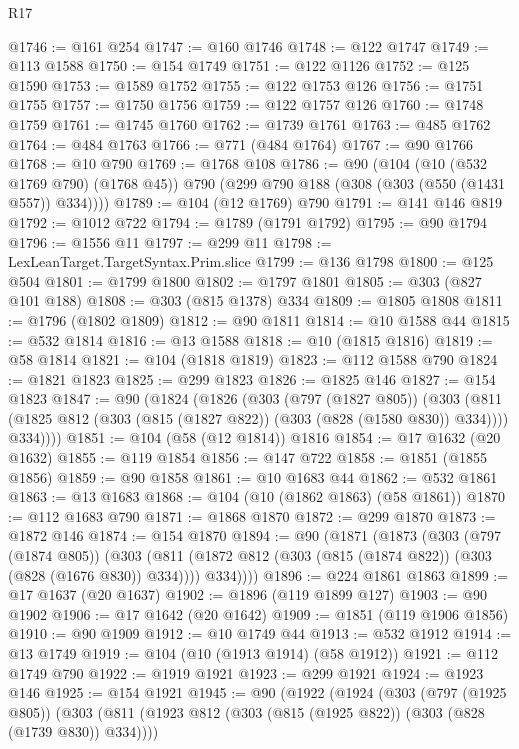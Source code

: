\begin{lexlean}{R17}
\begin{coremodule}
@1746 := @161 @254
@1747 := @160 @1746
@1748 := @122 @1747
@1749 := @113 @1588
@1750 := @154 @1749
@1751 := @122 @1126
@1752 := @125 @1590
@1753 := @1589 @1752
@1755 := @122 @1753 @126
@1756 := @1751 @1755
@1757 := @1750 @1756
@1759 := @122 @1757 @126
@1760 := @1748 @1759
@1761 := @1745 @1760
@1762 := @1739 @1761
@1763 := @485 @1762
@1764 := @484 @1763
@1766 := @771 (@484 @1764)
@1767 := @90 @1766
@1768 := @10 @790
@1769 := @1768 @108
@1786 := @90
    (@104
      (@10 (@532 @1769 @790) (@1768 @45))
      @790
      (@299 @790 @188 (@308 (@303 (@550 (@1431 @557)) @334))))
@1789 := @104 (@12 @1769) @790
@1791 := @141 @146 @819
@1792 := @1012 @722
@1794 := @1789 (@1791 @1792)
@1795 := @90 @1794
@1796 := @1556 @11
@1797 := @299 @11
@1798 := LexLeanTarget.TargetSyntax.Prim.slice
@1799 := @136 @1798
@1800 := @125 @504
@1801 := @1799 @1800
@1802 := @1797 @1801
@1805 := @303 (@827 @101 @188)
@1808 := @303 (@815 @1378) @334
@1809 := @1805 @1808
@1811 := @1796 (@1802 @1809)
@1812 := @90 @1811
@1814 := @10 @1588 @44
@1815 := @532 @1814
@1816 := @13 @1588
@1818 := @10 (@1815 @1816)
@1819 := @58 @1814
@1821 := @104 (@1818 @1819)
@1823 := @112 @1588 @790
@1824 := @1821 @1823
@1825 := @299 @1823
@1826 := @1825 @146
@1827 := @154 @1823
@1847 := @90
    (@1824
      (@1826
        (@303
          (@797 (@1827 @805))
          (@303
            (@811 (@1825 @812 (@303 (@815 (@1827 @822)) (@303 (@828 (@1580 @830)) @334))))
            @334))))
@1851 := @104 (@58 (@12 @1814)) @1816
@1854 := @17 @1632 (@20 @1632)
@1855 := @119 @1854
@1856 := @147 @722
@1858 := @1851 (@1855 @1856)
@1859 := @90 @1858
@1861 := @10 @1683 @44
@1862 := @532 @1861
@1863 := @13 @1683
@1868 := @104 (@10 (@1862 @1863) (@58 @1861))
@1870 := @112 @1683 @790
@1871 := @1868 @1870
@1872 := @299 @1870
@1873 := @1872 @146
@1874 := @154 @1870
@1894 := @90
    (@1871
      (@1873
        (@303
          (@797 (@1874 @805))
          (@303
            (@811 (@1872 @812 (@303 (@815 (@1874 @822)) (@303 (@828 (@1676 @830)) @334))))
            @334))))
@1896 := @224 @1861 @1863
@1899 := @17 @1637 (@20 @1637)
@1902 := @1896 (@119 @1899 @127)
@1903 := @90 @1902
@1906 := @17 @1642 (@20 @1642)
@1909 := @1851 (@119 @1906 @1856)
@1910 := @90 @1909
@1912 := @10 @1749 @44
@1913 := @532 @1912
@1914 := @13 @1749
@1919 := @104 (@10 (@1913 @1914) (@58 @1912))
@1921 := @112 @1749 @790
@1922 := @1919 @1921
@1923 := @299 @1921
@1924 := @1923 @146
@1925 := @154 @1921
@1945 := @90
    (@1922
      (@1924
        (@303
          (@797 (@1925 @805))
          (@303
            (@811 (@1923 @812 (@303 (@815 (@1925 @822)) (@303 (@828 (@1739 @830)) @334))))

\end{coremodule}
\end{lexlean}
